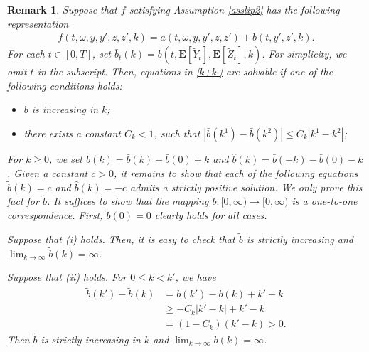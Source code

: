 \documentclass[10pt]{article}%
\numberwithin{equation}{section}
\newtheorem{remark}[theorem]{Remark}
\begin{document}
\begin{remark}
  Suppose that $f$ satisfying Assumption \ref{asslip2} has the following representation 
  \begin{align}\label{repre of f}f(t,\omega,y,y',z,z',k)=a(t,\omega,y,y',z,z')+b(t,y',z',k).
  \end{align}
  For each $t\in[0,T]$, set $\bar{b}_t(k)=b(t,\mathbf{E}[\widetilde{Y}_t],\mathbf{E}[\widetilde{Z}_t],k)$. For simplicity, we omit $t$ in the subscript. Then, equations in  \eqref{k+k-} are solvable if one of the following  conditions holds:
\begin{itemize}
    \item [(i)] $\bar{b}$ is increasing in $k$;
    \item[(ii)] there exists a constant $C_k<1$, such that $\left|\bar{b}(k^1)-\bar{b}(k^2)\right|\leq C_k\left|k^1-k^2\right|$;
\end{itemize} 

For $k\geq 0$, we set $ \widetilde{b}(k)=\bar{b}(k)-\bar{b}(0)+k$ and $\widehat{b}(k)=\bar{b}(-k)-\bar{b}(0)-k$. Given a constant $c>0$, it remains to show that each of the following equations $\widetilde{b}(k)=c$ and $\widehat{b}(k)=-c$ admits a strictly positive solution. We only prove this fact for $\widetilde{b}$. It suffices to show that the mapping $\widetilde{b}:[0,\infty)\rightarrow[0,\infty)$ is a one-to-one correspondence. First, $\widetilde{b}(0)=0$ clearly holds for all cases. 

  Suppose that (i) holds. Then, it is easy to check that $\widetilde{b}$ is strictly increasing and $\lim_{k\rightarrow\infty}\widetilde{b}(k)=\infty$. %

Suppose that (ii) holds. For $0\leq k < k'$, we have 
\begin{equation*}
    \begin{split}
       \widetilde{b}(k')-\widetilde{b}(k)&= \bar{b}(k')-\bar{b}(k)+k'-k\\
   &\geq -C_k\left|k'-k\right|+k'-k\\
   &=(1-C_k)(k'-k)> 0. 
    \end{split}
\end{equation*}
Then $\widetilde{b}$ is strictly increasing in $k$ and $\lim_{k\rightarrow\infty}\widetilde{b}(k)=\infty$.


\end{remark}
\end{document}
